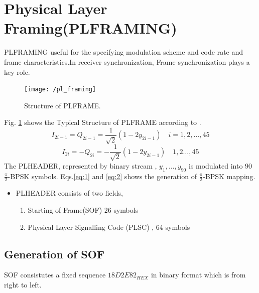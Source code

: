 \documentclass[journal,12pt,twocolumn]{IEEEtran}
\begin{document}
\section{Physical Layer Framing(PLFRAMING)}

PLFRAMING useful for the specifying modulation scheme and code rate and frame characteristics.In receiver synchronization, Frame synchronization plays a key role. 



\begin{figure}
\begin{center}
\texttt{[image: /pl\_framing]}
\end{center}
\caption{Structure of PLFRAME.}
\label{fig:splframe}
\end{figure}

 Fig. \ref{fig:splframe} shows the Typical Structure of PLFRAME according to \cite{dvb}.
 \begin{equation}\label{eq:1}
I_{2i-1}=Q_{2i-1}=\frac{1}{\sqrt{2}}(1-2y_{2i-1}) \quad i=1,2,\dots,45
\end{equation}
\begin{equation}\label{eq:2}
I_{2i}=-Q_{2i}=-\frac{1}{\sqrt{2}}(1-2y_{2i-1}) \quad 1,2\dots,45
\end{equation}
The PLHEADER, represented by binary stream , $y_1,\dots,y_{90}$ is modulated into 90 $\frac{\pi}{2}$-BPSK symbols. Eqs.\eqref{eq:1} and \eqref{eq:2} shows the generation of $\frac{\pi}{2}$-BPSK mapping.


\begin{itemize}
\item PLHEADER consists of two fields,
\begin{enumerate}
\item Starting of Frame(SOF) 26 symbols
\item Physical Layer Signalling Code (PLSC) , 64 symbols
\end{enumerate}
\end{itemize} 
\subsection{Generation of SOF}
SOF consistutes a fixed sequence $18D2E82_{HEX}$ in binary format which is from right to left.
\end{document}

